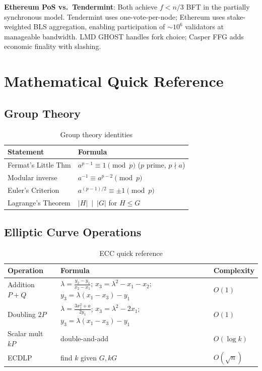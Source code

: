 \documentclass[12pt,a4paper,openany]{book}
\theoremstyle{definition}
\theoremstyle{plain}
\theoremstyle{remark}
\begin{document}
\begin{exambox}
  \textbf{Ethereum PoS vs.\ Tendermint}: Both achieve $f<n/3$ BFT in
  the partially synchronous model.  Tendermint uses one-vote-per-node;
  Ethereum uses stake-weighted BLS aggregation, enabling participation
  of $\sim\!10^6$ validators at manageable bandwidth.  LMD GHOST handles
  fork choice; Casper FFG adds economic finality with slashing.
\end{exambox}


\appendix
\chapter{Mathematical Quick Reference}

\section{Group Theory}

\begin{table}[h]
\centering
\caption{Group theory identities}
\begin{tabular}{ll}
\toprule
\textbf{Statement} & \textbf{Formula} \\
\midrule
Fermat's Little Thm & $a^{p-1}\equiv 1\pmod p$ ($p$ prime, $p\nmid a$) \\
Modular inverse     & $a^{-1}\equiv a^{p-2}\pmod p$ \\
Euler's Criterion   & $a^{(p-1)/2}\equiv\pm 1\pmod p$ \\
Lagrange's Theorem  & $|H|\ \mid\ |G|$ for $H\leq G$ \\
\bottomrule
\end{tabular}
\end{table}

\section{Elliptic Curve Operations}

\begin{table}[h]
\centering
\caption{ECC quick reference}
\begin{tabular}{p{3.5cm}p{6cm}p{2cm}}
\toprule
\textbf{Operation} & \textbf{Formula} & \textbf{Complexity} \\
\midrule
Addition $P+Q$ & $\lambda=\frac{y_2-y_1}{x_2-x_1}$; $x_3=\lambda^2-x_1-x_2$; $y_3=\lambda(x_1-x_3)-y_1$ & $O(1)$ \\
Doubling $2P$ & $\lambda=\frac{3x_1^2+a}{2y_1}$; $x_3=\lambda^2-2x_1$; $y_3=\lambda(x_1-x_3)-y_1$ & $O(1)$ \\
Scalar mult $kP$ & double-and-add & $O(\log k)$ \\
ECDLP & find $k$ given $G,kG$ & $O(\sqrt{n})$ \\
\bottomrule
\end{tabular}
\end{table}
\end{document}

